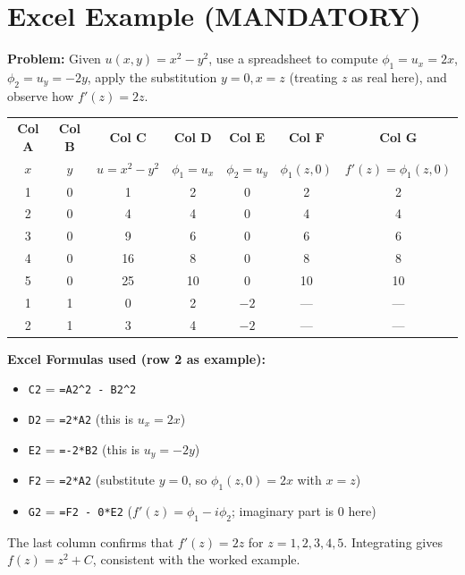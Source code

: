 \documentclass[12pt,a4paper]{article}
\begin{document}
\section{Excel Example (MANDATORY)}

\textbf{Problem:} Given \( u(x,y) = x^2 - y^2 \), use a spreadsheet to compute \( \phi_1 = u_x = 2x \), \( \phi_2 = u_y = -2y \), apply the substitution \( y = 0, x = z \) (treating \( z \) as real here), and observe how \( f'(z) = 2z \).

\begin{center}
\begin{tabular}{@{}ccccccc@{}}
\toprule
\textbf{Col A} & \textbf{Col B} & \textbf{Col C} & \textbf{Col D} & \textbf{Col E} & \textbf{Col F} & \textbf{Col G} \\
\( x \) & \( y \) & \( u = x^2-y^2 \) & \( \phi_1 = u_x \) & \( \phi_2 = u_y \) & \( \phi_1(z,0) \) & \( f'(z) = \phi_1(z,0) \) \\
\midrule
1 & 0 & 1 & 2 & 0 & 2 & 2 \\
2 & 0 & 4 & 4 & 0 & 4 & 4 \\
3 & 0 & 9 & 6 & 0 & 6 & 6 \\
4 & 0 & 16 & 8 & 0 & 8 & 8 \\
5 & 0 & 25 & 10 & 0 & 10 & 10 \\
\midrule
1 & 1 & 0 & 2 & $-2$ & --- & --- \\
2 & 1 & 3 & 4 & $-2$ & --- & --- \\
\bottomrule
\end{tabular}
\end{center}

\textbf{Excel Formulas used (row 2 as example):}
\begin{itemize}
  \item \texttt{C2} = \texttt{=A2\^{}2 - B2\^{}2}
  \item \texttt{D2} = \texttt{=2*A2} \quad (this is \( u_x = 2x \))
  \item \texttt{E2} = \texttt{=-2*B2} \quad (this is \( u_y = -2y \))
  \item \texttt{F2} = \texttt{=2*A2} \quad (substitute \( y=0 \), so \( \phi_1(z,0) = 2x \) with \( x = z \))
  \item \texttt{G2} = \texttt{=F2 - 0*E2} \quad (\( f'(z) = \phi_1 - i\phi_2 \); imaginary part is 0 here)
\end{itemize}

The last column confirms that \( f'(z) = 2z \) for \( z = 1,2,3,4,5 \). Integrating gives \( f(z) = z^2 + C \), consistent with the worked example.
\end{document}
